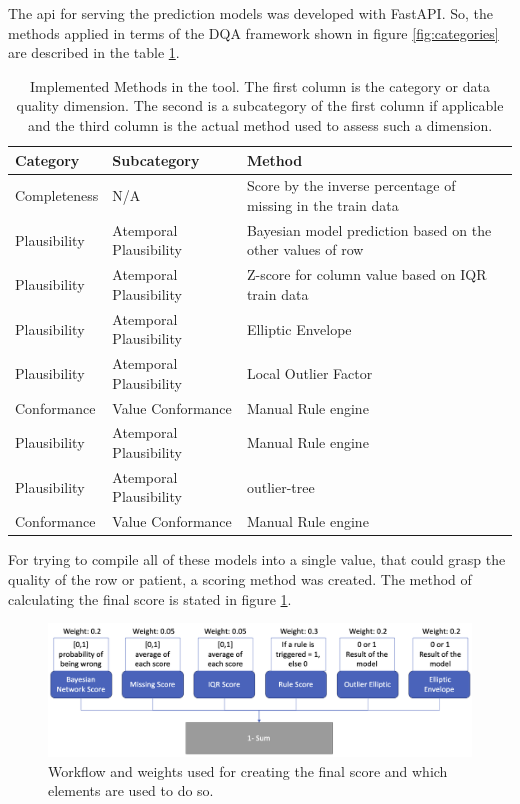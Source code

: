 The \ac{api} for serving the prediction models was developed with FastAPI. So, the methods applied in terms of the DQA framework shown in figure \ref{fig:categories} are described in the table \ref{tab:methods}.

\begin{table}[htpb]
\caption{Implemented Methods in the tool. The first column is the category or data quality dimension. The second is a subcategory of the first column if applicable and the third column is the actual method used to assess such a dimension.} \label{tab:methods}
\renewcommand{\arraystretch}{1.4}
\setlength{\tabcolsep}{10pt}

\begin{tabularx}{\textwidth}{ p{2cm} p{3.5cm} X }
\hline
 Category   & Subcategory           & Method   \\ \hline
Completeness     & N/A               & Score by the inverse percentage of missing in the train data         \\ 
Plausibility & Atemporal Plausibility & Bayesian model prediction based on the other values of row \\ 
Plausibility & Atemporal Plausibility         & Z-score for column value based on IQR train data       \\    
Plausibility & Atemporal Plausibility           & Elliptic Envelope                       \\ 
Plausibility & Atemporal Plausibility           & Local Outlier Factor                \\ 
Conformance & Value Conformance           & Manual Rule engine                           \\ 
Plausibility & Atemporal Plausibility           & Manual Rule engine                      \\ 
Plausibility & Atemporal Plausibility           & outlier-tree                      \\ 
Conformance & Value Conformance & Manual Rule engine\\
\hline
\end{tabularx}

\end{table}


For trying to compile all of these models into a single value, that could grasp the quality of the row or patient, a scoring method was created. The method of calculating the final score is stated in figure \ref{fig:scoring_method}. 
\begin{figure}[htbp]
    \centering
    \caption{Workflow and weights used for creating the final score and which elements are used to do so.}\label{fig:scoring_method} 
    \includegraphics[scale=0.29]{figures/score-method.png}
    \end{figure}

